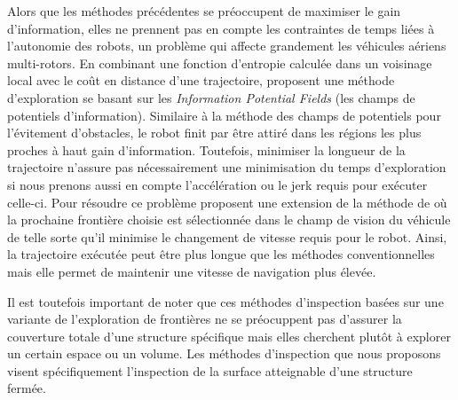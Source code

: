Alors que les méthodes précédentes se préoccupent de maximiser le gain d'information, elles ne prennent pas en compte les contraintes de temps liées à l'autonomie des robots, un problème qui affecte grandement les véhicules aériens multi-rotors. En combinant une fonction d'entropie calculée dans un voisinage local avec le coût en distance d'une trajectoire, \cite{Wang2017} proposent une méthode d'exploration se basant sur les \textit{Information Potential Fields} (les champs de potentiels d'information). Similaire à la méthode des champs de potentiels pour l'évitement d'obstacles, le robot finit par être attiré dans les régions les plus proches à haut gain d'information. Toutefois, minimiser la longueur de la trajectoire n'assure pas nécessairement une minimisation du temps d'exploration si nous prenons aussi en compte l'accélération ou le jerk requis pour exécuter celle-ci. Pour résoudre ce problème \cite{Cieslewski2017} proposent une extension de la méthode de \cite{Yamauchi1997} où la prochaine frontière choisie est sélectionnée dans le champ de vision du véhicule de telle sorte qu'il minimise le changement de vitesse requis pour le robot. Ainsi, la trajectoire exécutée peut être plus longue que les méthodes conventionnelles mais elle permet de maintenir une vitesse de navigation plus élevée.

Il est toutefois important de noter que ces méthodes d'inspection basées sur une variante de l'exploration de frontières ne se préocuppent pas d'assurer la couverture totale d'une structure spécifique mais elles cherchent plutôt à explorer un certain espace ou un volume. Les méthodes d'inspection que nous proposons visent spécifiquement l'inspection de la surface atteignable d'une structure fermée.

